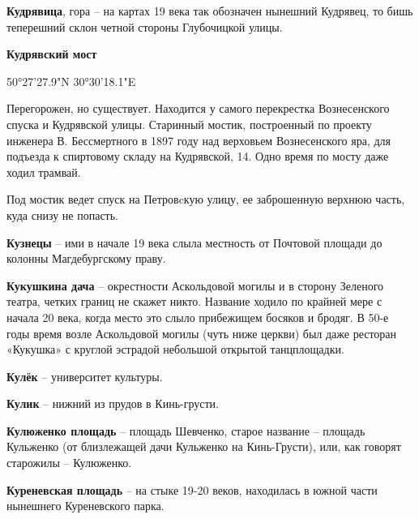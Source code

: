 \medskip

\textbf{Кудрявица}, гора – на картах 19 века так обозначен нынешний Кудрявец, то бишь теперешний склон четной стороны Глубочицкой улицы.\\


\medskip

\textbf{Кудрявский мост}

50°27'27.9"N 30°30'18.1"E

Перегорожен, но существует. Находится у самого перекрестка Вознесенского спуска и Кудрявской улицы. Старинный мостик, построенный по проекту инженера В. Бессмертного в 1897 году над верховьем Вознесенского яра, для подъезда к спиртовому складу на Кудрявской, 14. Одно время по мосту даже ходил трамвай.

Под мостик ведет спуск на Петровcкую улицу, ее заброшенную верхнюю часть, куда снизу не попасть.\\

\medskip


\textbf{Кузнецы} – ими в начале 19 века слыла местность от Почтовой площади до колонны Магдебургскому праву.\\

\medskip

\textbf{Кукушкина дача} – окрестности Аскольдовой могилы и в сторону Зеленого театра, четких границ не скажет никто. Название ходило по крайней мере с начала 20 века, когда место это слыло прибежищем босяков и бродяг. В 50-е годы время возле Аскольдовой могилы (чуть ниже церкви) был даже ресторан «Кукушка» с круглой эстрадой небольшой открытой танцплощадки. \\

\medskip

\textbf{Кулёк} – университет культуры.\\


\medskip

\textbf{Кулик} – нижний из прудов в Кинь-грусти.\\

\medskip

\textbf{Кулюженко площадь} – площадь Шевченко, старое название – площадь Кульженко (от близлежащей дачи Кульженко на Кинь-Грусти), или, как говорят старожилы – Кулюженко.\\

\medskip

\textbf{Куреневская площадь} – на стыке 19-20 веков, находилась в южной части нынешнего Куреневского парка.\\

